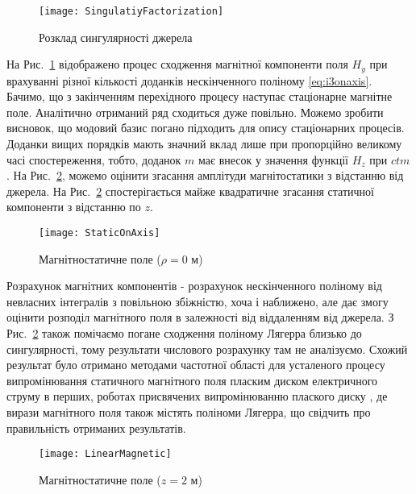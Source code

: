 \begin{figure}[h] \begin{center}
\texttt{[image: SingulatiyFactorization]}
\caption{Розклад сингулярності джерела} \label{fig:singulatiy_factorization}
\end{center} \end{figure}

На Рис.~\ref{fig:singulatiy_factorization} відображено процес сходження 
магнітної компоненти поля $ H_y $ при врахуванні різної кількості доданків
нескінченного поліному \eqref{eq:i3onaxis}. Бачимо, що з закінченням 
перехідного процесу наступає стаціонарне магнітне поле. Аналітично отриманий 
ряд сходиться дуже повільно. Можемо зробити висновок, що модовий базис 
погано підходить для опису стаціонарних процесів. Доданки вищих порядків 
мають значний вклад лише при пропорційно великому часі спостереження,
тобто, доданок $ m $ має внесок у значення функції $ H_z $ при $ ctm $.
На Рис.~\ref{fig:emp_h_z}, можемо оцінити згасання амплітуди 
магнітостатики з відстанню від джерела. На Рис.~\ref{fig:emp_h_z} 
спостерігається майже квадратичне згасання статичної 
компоненти з відстанню по $ z $. 

\begin{figure}[h] \begin{center}
\texttt{[image: StaticOnAxis]}
\caption{Магнітностатичне поле ($ \rho = 0 $ м)} \label{fig:emp_h_z}
\end{center} \end{figure}

Розрахунок магнітних компонентів - розрахунок нескінченного 
поліному від невласних інтегралів з повільною збіжністю,
хоча і наближено, але дає змогу оцінити розподіл магнітного поля в 
залежності від віддаленням від джерела. З Рис.~\ref{fig:emp_h_z} також 
помічаємо погане сходження поліному Лягерра близько до сингулярності, тому 
результати числового розрахунку там не аналізуємо. Схожий результат було 
отримано методами частотної області для усталеного процесу випромінювання 
статичного магнітного поля пласким диском електричного струму в перших, 
роботах присвячених випромінюванню плаского диску \cite{imp:BaumIN0009}, 
де вирази магнітного поля також містять поліноми Лягерра, що свідчить про 
правильність отриманих результатів.

\begin{figure}[h] \begin{center}
\texttt{[image: LinearMagnetic]}
\caption{Магнітностатичне поле ($ z = 2 $ м)} \label{fig:emp_h_rho}
\end{center} \end{figure}

